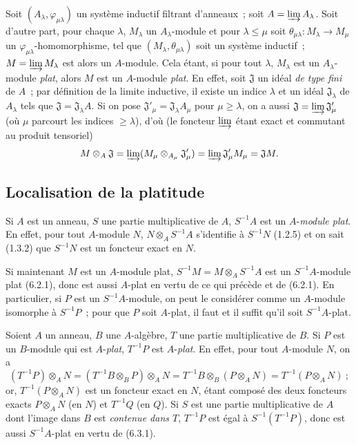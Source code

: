 \begin{env}[6.2.3]
\label{0.6.2.3-fr}
Soit $(A_\lambda,\varphi_{\mu\lambda})$ un système inductif filtrant
d'anneaux~; soit $A=\varinjlim A_\lambda$. Soit d'autre part, pour chaque
$\lambda$, $M_\lambda$ un $A_\lambda$-module et pour $\lambda\leq\mu$ soit
$\theta_{\mu\lambda}:M_\lambda\to M_\mu$ un
$\varphi_{\mu\lambda}$-homomorphisme, tel que
$(M_\lambda,\theta_{\mu\lambda})$ soit un système inductif~;
$M=\varinjlim M_\lambda$ est alors un $A$-module. Cela étant, si pour tout
$\lambda$, $M_\lambda$ est un $A_\lambda$-module \emph{plat}, alors $M$ est
un $A$-module \emph{plat}. En effet, soit $\mathfrak{J}$ un idéal \emph{de
type fini} de $A$~; par définition de la limite inductive, il existe un
indice $\lambda$ et un idéal $\mathfrak{J}_\lambda$ de $A_\lambda$ tels que
$\mathfrak{J}=\mathfrak{J}_\lambda A$. Si on pose
$\mathfrak{J}'_\mu=\mathfrak{J}_\lambda A_\mu$ pour $\mu\geq\lambda$, on a
aussi $\mathfrak{J}=\varinjlim\mathfrak{J}'_\mu$ (où $\mu$ parcourt les
indices $\geq\lambda$), d'où (le foncteur $\varinjlim$ étant exact et
commutant au produit tensoriel)
\[
  M\otimes_A\mathfrak{J}
  =\varinjlim(M_\mu\otimes_{A_\mu}\mathfrak{J}'_\mu)
  =\varinjlim\mathfrak{J}'_\mu M_\mu
  =\mathfrak{J}M.
\]
\end{env}

\subsection{Localisation de la platitude}
\label{subsection:0.6.3-fr}

\begin{env}[6.3.1]
\label{0.6.3.1-fr}
Si $A$ est un anneau, $S$ une partie multiplicative de $A$, $S^{-1}A$ est
un $A$-\emph{module plat}. En effet, pour tout $A$-module $N$,
$N\otimes_A S^{-1}A$ s'identifie à $S^{-1}N$ (1.2.5) et on sait (1.3.2)
que $S^{-1}N$ est un foncteur exact en $N$.

Si maintenant $M$ est un $A$-module plat,
$S^{-1}M=M\otimes_A S^{-1}A$ est un $S^{-1}A$-module plat (6.2.1), donc
est aussi $A$-plat en vertu de ce qui précède et de (6.2.1). En particulier,
si $P$ est un $S^{-1}A$-module, on peut le considérer comme un $A$-module
isomorphe à $S^{-1}P$~; pour que $P$ soit $A$-plat, il faut et il suffit
qu'il soit $S^{-1}A$-plat.
\end{env}

\begin{env}[6.3.2]
\label{0.6.3.2-fr}
Soient $A$ un anneau, $B$ une $A$-algèbre, $T$ une partie multiplicative de
$B$. Si $P$ est un $B$-module qui est $A$-\emph{plat}, $T^{-1}P$ est $A$-\emph{plat}. En
effet, pour tout $A$-module $N$, on a
\[
  (T^{-1}P)\otimes_A N
  =(T^{-1}B\otimes_B P)\otimes_A N
  =T^{-1}B\otimes_B(P\otimes_A N)
  =T^{-1}(P\otimes_A N)~;
\]
or, $T^{-1}(P\otimes_A N)$ est un foncteur exact en $N$, étant composé des
deux foncteurs exacts $P\otimes_A N$ (en $N$) et $T^{-1}Q$ (en $Q$). Si $S$
est une partie multiplicative de $A$ dont l'image dans $B$ est
\emph{contenue dans $T$}, $T^{-1}P$ est égal à $S^{-1}(T^{-1}P)$, donc est
aussi $S^{-1}A$-plat en vertu de (6.3.1).
\end{env}

